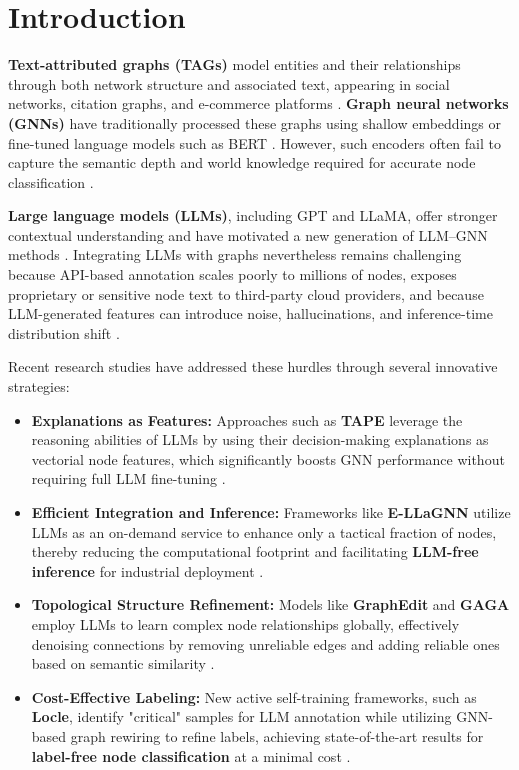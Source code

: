 \documentclass[a4paper,fleqn]{cas-sc}
\begin{document}
\section{Introduction}

\textbf{Text-attributed graphs (TAGs)} model entities and their relationships through both network structure and associated text, appearing in social networks, citation graphs, and e-commerce platforms \citep{zhang2025leveraging, he2024harnessing}. \textbf{Graph neural networks (GNNs)} have traditionally processed these graphs using shallow embeddings or fine-tuned language models such as BERT \citep{devlin2018bert}. However, such encoders often fail to capture the semantic depth and world knowledge required for accurate node classification \citep{he2024harnessing, zhang2025leveraging}.

\textbf{Large language models (LLMs)}, including GPT and LLaMA, offer stronger contextual understanding and have motivated a new generation of LLM--GNN methods \citep{brown2020language, touvron2023llama}. Integrating LLMs with graphs nevertheless remains challenging because API-based annotation scales poorly to millions of nodes, exposes proprietary or sensitive node text to third-party cloud providers, and because LLM-generated features can introduce noise, hallucinations, and inference-time distribution shift \citep{Jaiswal2024AllAgainstSome, hu2025gaga, zhang2025leveraging}.


Recent research studies have addressed these hurdles through several innovative strategies:
\begin{itemize}
    \item \textbf{Explanations as Features:} Approaches such as \textbf{TAPE} leverage the reasoning abilities of LLMs by using their decision-making explanations as vectorial node features, which significantly boosts GNN performance without requiring full LLM fine-tuning  \citep{he2024harnessing}.
    \item \textbf{Efficient Integration and Inference:} Frameworks like \textbf{E-LLaGNN} utilize LLMs as an on-demand service to enhance only a tactical fraction of nodes, thereby reducing the computational footprint and facilitating \textbf{LLM-free inference} for industrial deployment  \citep{Jaiswal2024AllAgainstSome}.
    \item \textbf{Topological Structure Refinement:} Models like \textbf{GraphEdit} and \textbf{GAGA} employ LLMs to learn complex node relationships globally, effectively denoising connections by removing unreliable edges and adding reliable ones based on semantic similarity  \citep{guo2024graphedit, li2024gaga, Sun2026TopologicalEnhancerTAG}.
    \item \textbf{Cost-Effective Labeling:} New active self-training frameworks, such as \textbf{Locle}, identify "critical" samples for LLM annotation while utilizing GNN-based graph rewiring to refine labels, achieving state-of-the-art results for \textbf{label-free node classification} at a minimal cost  \citep{zhang2025leveraging}.
\end{itemize}
\end{document}
